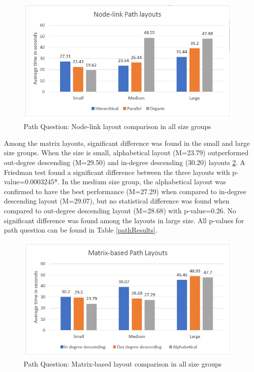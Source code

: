 \documentclass{l4proj}
\begin{document}
\begin{figure}[H]
\centering
\includegraphics[width=13cm]{images/nodePathLayouts.PNG}
\caption{Path Question: Node-link layout comparison in all size groups}
\label{nodePathLayouts}
\end{figure}

Among the matrix layouts, significant difference was found in the small and large size groups. When the size is small, alphabetical layout (M=23.79) outperformed out-degree descending (M=29.50) and in-degree descending (30.20) layouts \ref{matrixpathlayouts}. A Friedman test found a significant difference between the three layouts with p-value=0.0003245*. In the medium size group, the alphabetical layout was confirmed to have the best performance (M=27.29) when compared to in-degree descending layout (M=29.07), but no statistical difference was found when compared to out-degree descending layout (M=28.68) with p-value=0.26. No significant difference was found among the layouts in large size. All p-values for path question can be found in Table \ref{pathResults}.

\begin{figure}[H]
\centering
\includegraphics[width=13cm]{images/matrixpathlayouts.PNG}
\caption{Path Question: Matrix-based layout comparison in all size groups}
\label{matrixpathlayouts}
\end{figure}
\end{document}
